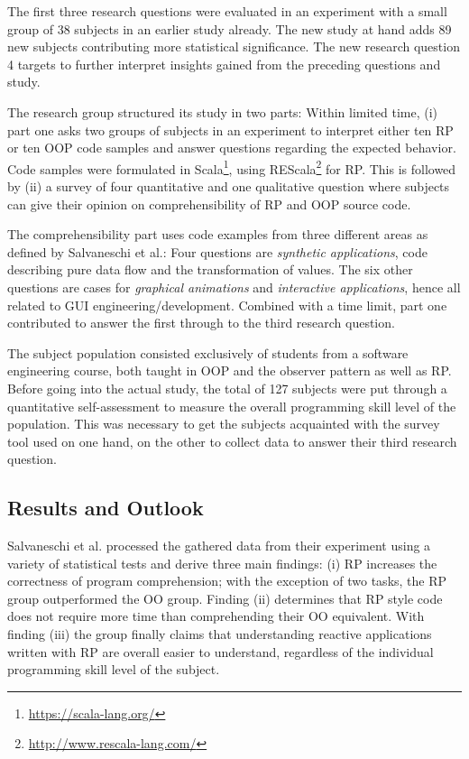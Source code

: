 \documentclass[12pt,a4paper]{article}
\begin{document}
The first three research questions were evaluated in an experiment with a small group of 38 subjects in an earlier study \cite{Salvaneschi:2014:ESP:2635868.2635895} already. The new study at hand adds 89 new subjects contributing more statistical significance. The new research question 4 targets to further interpret insights gained from the preceding questions and study.

The research group structured its study in two parts: Within limited time, (i) part one asks two groups of subjects in an experiment to interpret either ten RP or ten OOP code samples and answer questions regarding the expected behavior. Code samples were formulated in Scala\footnote{\url{https://scala-lang.org/}}, using REScala\footnote{\url{http://www.rescala-lang.com/}} for RP. This is followed by (ii) a survey of four quantitative and one qualitative question where subjects can give their opinion on comprehensibility of RP and OOP source code.

The comprehensibility part uses code examples from three different areas as defined by Salvaneschi et al.: Four questions are \emph{synthetic applications}, code describing pure data flow and the transformation of values. The six other questions are cases for \emph{graphical animations} and \emph{interactive applications}, hence all related to GUI engineering/development. Combined with a time limit, part one contributed to answer the first through to the third research question.

The subject population consisted exclusively of students from a software engineering course, both taught in OOP and the observer pattern as well as RP. Before going into the actual study, the total of 127 subjects were put through a quantitative self-assessment to measure the overall programming skill level of the population. This was necessary to get the subjects acquainted with the survey tool used on one hand, on the other to collect data to answer their third research question.

\subsection{Results and Outlook}

Salvaneschi et al. processed the gathered data from their experiment using a variety of statistical tests and derive three main findings: (i) RP increases the correctness of program comprehension; with the exception of two tasks, the RP group outperformed the OO group. Finding (ii) determines that RP style code does not require more time than comprehending their OO equivalent. With finding (iii) the group finally claims that understanding reactive applications written with RP are overall easier to understand, regardless of the individual programming skill level of the subject.
\end{document}
